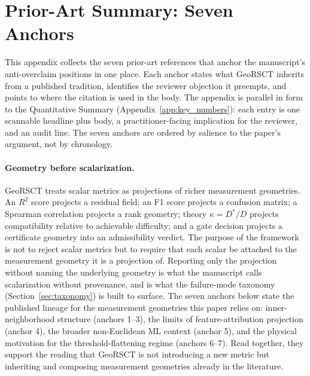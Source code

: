 \documentclass{article}
\begin{document}
\section{Prior-Art Summary: Seven Anchors}
\label{app:seven_anchors}

This appendix collects the seven prior-art references that anchor the manuscript's anti-overclaim positions in one place. Each anchor states what GeoRSCT inherits from a published tradition, identifies the reviewer objection it preempts, and points to where the citation is used in the body. The appendix is parallel in form to the Quantitative Summary (Appendix~\ref{app:key_numbers}): each entry is one scannable headline plus body, a practitioner-facing implication for the reviewer, and an audit line. The seven anchors are ordered by salience to the paper's argument, not by chronology.

\paragraph{Geometry before scalarization.}
GeoRSCT treats scalar metrics as projections of richer measurement geometries. An $R^2$ score projects a residual field; an F1 score projects a confusion matrix; a Spearman correlation projects a rank geometry; theory $\kappa = D^*/D$ projects compatibility relative to achievable difficulty; and a gate decision projects a certificate geometry into an admissibility verdict. The purpose of the framework is not to reject scalar metrics but to require that each scalar be attached to the measurement geometry it is a projection of. Reporting only the projection without naming the underlying geometry is what the manuscript calls scalarization without provenance, and is what the failure-mode taxonomy (Section~\ref{sec:taxonomy}) is built to surface. The seven anchors below state the published lineage for the measurement geometries this paper relies on: inner-neighborhood structure (anchors 1--3), the limits of feature-attribution projection (anchor 4), the broader non-Euclidean ML context (anchor 5), and the physical motivation for the threshold-flattening regime (anchors 6--7). Read together, they support the reading that GeoRSCT is not introducing a new metric but inheriting and composing measurement geometries already in the literature.
\end{document}
